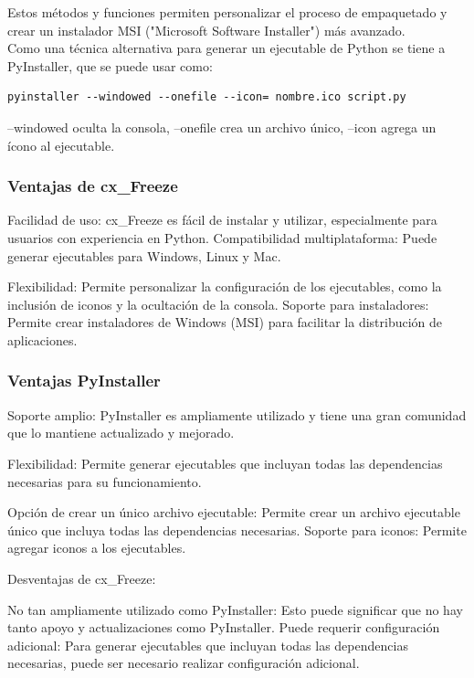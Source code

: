 Estos métodos y funciones  permiten personalizar el proceso de empaquetado y crear un instalador   MSI
("{}Microsoft Software Installer{}") más avanzado.\\




Como una técnica alternativa  para generar un ejecutable de Python  se tiene a {\ttfamily PyInstaller}, que se puede usar como:
\begin{lstlisting}		
pyinstaller --windowed --onefile --icon= nombre.ico script.py		
\end{lstlisting}	
{\ttfamily --windowed} oculta la consola,
{\ttfamily --onefile} crea un archivo único,
{\ttfamily --icon} agrega un ícono al ejecutable.







\subsubsection*{Ventajas de  cx\_Freeze}

Facilidad de uso:  {\ttfamily cx\_Freeze} es fácil de instalar y utilizar, especialmente para usuarios con experiencia en Python.
Compatibilidad multiplataforma: Puede generar ejecutables para Windows, Linux y Mac.

Flexibilidad: Permite personalizar la configuración de los ejecutables, como la inclusión de iconos y la ocultación de la consola.
Soporte para instaladores: Permite crear instaladores de Windows (MSI) para facilitar la distribución de aplicaciones.


\subsubsection*{Ventajas  PyInstaller}

Soporte amplio: {\ttfamily PyInstaller} es ampliamente utilizado y tiene una gran comunidad que lo mantiene actualizado y mejorado.

Flexibilidad: Permite generar ejecutables que incluyan todas las dependencias necesarias para su funcionamiento.

Opción de crear un único archivo ejecutable: Permite crear un archivo ejecutable único que incluya todas las dependencias necesarias.
Soporte para iconos: Permite agregar iconos a los ejecutables.

Desventajas de {\ttfamily cx\_Freeze}:

No tan ampliamente utilizado como {\ttfamily PyInstaller}: Esto puede significar que no hay tanto apoyo y actualizaciones como PyInstaller.
Puede requerir configuración adicional: Para generar ejecutables que incluyan todas las dependencias necesarias, puede ser necesario realizar configuración adicional.

